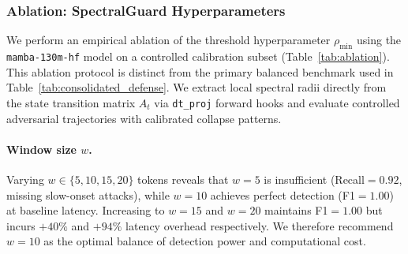 \documentclass[10pt,twocolumn]{article}
\begin{document}
\subsubsection{Ablation: SpectralGuard Hyperparameters}

We perform an empirical ablation of the threshold hyperparameter $\rho_{\min}$ using the \texttt{mamba-130m-hf} model on a controlled calibration subset (Table~\ref{tab:ablation}). This ablation protocol is distinct from the primary balanced benchmark used in Table~\ref{tab:consolidated_defense}. We extract local spectral radii directly from the state transition matrix $A_t$ via \texttt{dt\_proj} forward hooks and evaluate controlled adversarial trajectories with calibrated collapse patterns.

\begin{table}[t]
\centering
\caption{\textbf{Empirical Threshold Ablation (Mamba-130M, controlled subset).} Performance metrics for varying detection thresholds $\rho_{\min}$ on a calibration protocol. These values are for sensitivity analysis and are not the headline non-adaptive benchmark.}
\label{tab:ablation}
\renewcommand{\arraystretch}{1.2}
\end{table}

\paragraph{Window size $w$.}
Varying $w \in \{5, 10, 15, 20\}$ tokens reveals that $w{=}5$ is insufficient (Recall$=0.92$, missing slow-onset attacks), while $w{=}10$ achieves perfect detection (F1$=1.00$) at baseline latency. Increasing to $w{=}15$ and $w{=}20$ maintains F1$=1.00$ but incurs $+40\%$ and $+94\%$ latency overhead respectively. We therefore recommend $w{=}10$ as the optimal balance of detection power and computational cost.
\end{document}
